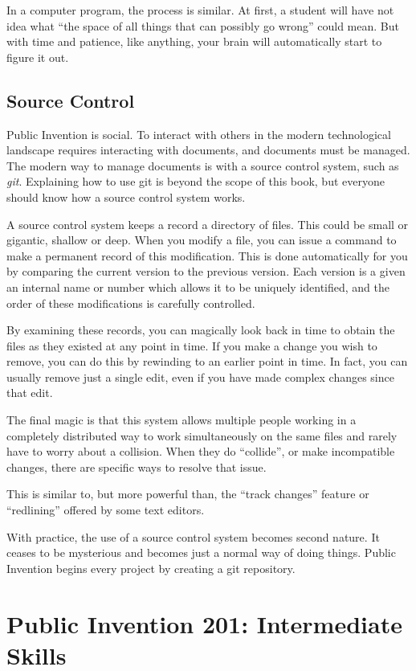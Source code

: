 \documentclass[
	fontsize=10pt, %
	twoside=false, %
	secnumdepth=1, %
]{kaobook}
\begin{document}
In a computer program, the process is similar. At first, a student will have not idea
what ``the space of all things that can possibly go wrong'' could mean. But with time and patience,
like anything, your brain will automatically start to figure it out.

\section{Source Control}

Public Invention is social. To interact with others
in the modern technological landscape requires interacting
with documents, and documents must be managed.
The modern way to manage documents is with a source control
system, such as {\em git}. Explaining how to use git is beyond
the scope of this book, but everyone should know how a source control
system works.

A source control system keeps a record a directory of files.
This could be small or gigantic, shallow or deep.
When you modify a file, you can issue a command to make a permanent
record of this modification. This is done automatically for you
by comparing the current version to the previous version.
Each version is a given an internal name or number which allows
it to be uniquely identified, and the order of these modifications
is carefully controlled.

By examining these records, you can magically look back in time
to obtain the files as they existed at any point in time.
If you make a change you wish to remove, you can do this by
rewinding to an earlier point in time.
In fact, you can usually remove just a single edit, even if
you have made complex changes since that edit.

The final magic is that this system allows multiple people
working in a completely distributed way to work simultaneously
on the same files and rarely have to worry about a collision.
When they do ``collide'', or make incompatible changes, there
are specific ways to resolve that issue.

This is similar to, but more powerful than, the ``track changes'' feature
or ``redlining'' offered by some text editors.

With practice, the use of a source control system becomes second nature.
It ceases to be mysterious and becomes just a normal way of doing things.
Public Invention begins every project by creating a git repository.

\chapter{Public Invention 201: Intermediate Skills}
\end{document}
